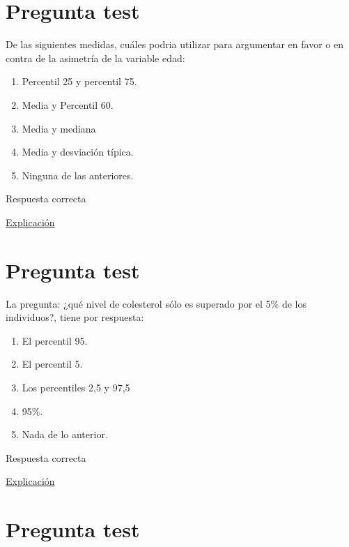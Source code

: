 \documentclass[
]{book}
\providecommand{\tightlist}{%
  \setlength{\itemsep}{0pt}\setlength{\parskip}{0pt}}
\begin{document}
\hypertarget{pregunta-test-66}{%
\section{Pregunta test}\label{pregunta-test-66}}

De las siguientes medidas, cuáles podria utilizar para argumentar en favor o en contra de la asimetría de la variable edad:

\begin{enumerate}
\def\labelenumi{\alph{enumi})}
\tightlist
\item
  Percentil 25 y percentil 75.
\item
  Media y Percentil 60.
\item
  Media y mediana
\item
  Media y desviación típica.
\item
  Ninguna de las anteriores.
\end{enumerate}

Respuesta correcta

\href{https://1fjmanzano.github.io/bioestadistica/medidas-de-forma.html}{Explicación}

\hypertarget{pregunta-test-67}{%
\section{Pregunta test}\label{pregunta-test-67}}

La pregunta: ¿qué nivel de colesterol sólo es superado por el 5\% de los individuos?, tiene por respuesta:

\begin{enumerate}
\def\labelenumi{\alph{enumi})}
\tightlist
\item
  El percentil 95.
\item
  El percentil 5.
\item
  Los percentiles 2,5 y 97,5
\item
  95\%.
\item
  Nada de lo anterior.
\end{enumerate}

Respuesta correcta

\href{https://1fjmanzano.github.io/bioestadistica/medidas-de-posicio\%CC\%81n-dispersio\%CC\%81n-y-forma.html\#medidas-de-posicio\%CC\%81n-no-centrales}{Explicación}

\hypertarget{pregunta-test-68}{%
\section{Pregunta test}\label{pregunta-test-68}}
\end{document}
